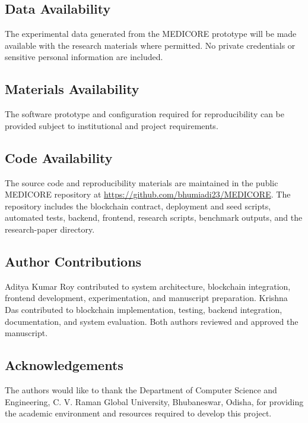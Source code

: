 \documentclass[11pt,a4paper]{article}
\begin{document}
\subsection*{Data Availability}
The experimental data generated from the MEDICORE prototype will be made available with the research materials where permitted. No private credentials or sensitive personal information are included.

\subsection*{Materials Availability}
The software prototype and configuration required for reproducibility can be provided subject to institutional and project requirements.

\subsection*{Code Availability}
The source code and reproducibility materials are maintained in the public MEDICORE repository at \url{https://github.com/bhumiadi23/MEDICORE}. The repository includes the blockchain contract, deployment and seed scripts, automated tests, backend, frontend, research scripts, benchmark outputs, and the research-paper directory.

\subsection*{Author Contributions}
Aditya Kumar Roy contributed to system architecture, blockchain integration, frontend development, experimentation, and manuscript preparation. Krishna Das contributed to blockchain implementation, testing, backend integration, documentation, and system evaluation. Both authors reviewed and approved the manuscript.

\subsection*{Acknowledgements}
The authors would like to thank the Department of Computer Science and Engineering, C. V. Raman Global University, Bhubaneswar, Odisha, for providing the academic environment and resources required to develop this project.
\end{document}
